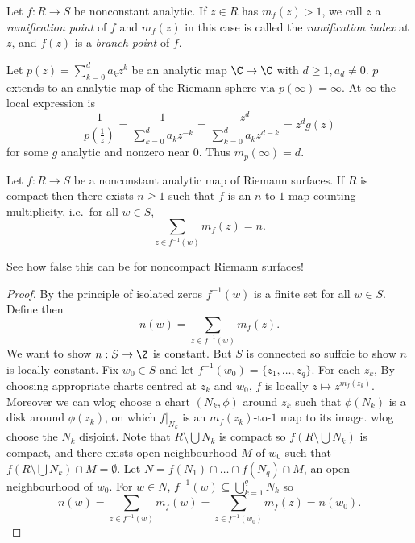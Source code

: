 \documentclass[a4paper]{article}
\begin{document}
\begin{definition}
  Let \(f: R \to S\) be nonconstant analytic. If \(z \in R\) has \(m_f(z) > 1\), we call \(z\) a \emph{ramification point} of \(f\) and \(m_f(z)\) in this case is called the \emph{ramification index} at \(z\), and \(f(z)\) is a \emph{branch point} of \(f\).
\end{definition}

\begin{eg}
  Let \(p(z) = \sum_{k = 0}^d a_kz^k\) be an analytic map \(\C \to \C\) with \(d \geq 1, a_d \neq 0\). \(p\) extends to an analytic map of the Riemann sphere via \(p(\infty) = \infty\). At \(\infty\) the local expression is
  \[
    \frac{1}{p(\frac{1}{z})} = \frac{1}{\sum_{k = 0}^d a_k z^{-k}} = \frac{z^d}{\sum_{k = 0}^d a_k z^{d - k}} = z^d g(z)
  \]
  for some \(g\) analytic and nonzero near \(0\). Thus \(m_p(\infty) = d\).
\end{eg}

\begin{theorem}
  Let \(f: R \to S\) be a nonconstant analytic map of Riemann surfaces. If \(R\) is compact then there exists \(n \geq 1\) such that \(f\) is an \(n\)-to-\(1\) map counting multiplicity, i.e.\ for all \(w \in S\),
  \[
    \sum_{z \in f^{-1}(w)} m_f(z) = n.
  \]
\end{theorem}

See how false this can be for noncompact Riemann surfaces!

\begin{proof}
  By the principle of isolated zeros \(f^{-1}(w)\) is a finite set for all \(w \in S\). Define then
  \[
    n(w) = \sum_{z \in f^{-1}(w)} m_f(z).
  \]
  We want to show \(n: S \to \Z\) is constant. But \(S\) is connected so suffcie to show \(n\) is locally constant. Fix \(w_0 \in S\) and let \(f^{-1}(w_0) = \{z_1, \dots, z_q\}\). For each \(z_k\), By choosing appropriate charts centred at \(z_k\) and \(w_0\), \(f\) is locally \(z \mapsto z^{m_f(z_k)}\). Moreover we can wlog choose a chart \((N_k, \phi)\) around \(z_k\) such that \(\phi(N_k)\) is a disk around \(\phi(z_k)\), on which \(f|_{N_k}\) is an \(m_f(z_k)\)-to-\(1\) map to its image. wlog choose the \(N_k\) disjoint. Note that \(R \setminus \bigcup N_k\) is compact so \(f(R \setminus \bigcup N_k)\) is compact, and there exists open neighbourhood \(M\) of \(w_0\) such that \(f(R \setminus \bigcup N_k) \cap M = \emptyset\). Let \(N = f(N_1) \cap \dots \cap f(N_q) \cap M\), an open neighbourhood of \(w_0\). For \(w \in N\), \(f^{-1}(w) \subseteq \bigcup_{k = 1}^q N_k\) so
  \[
    n(w) = \sum_{z \in f^{-1}(w)} m_f(w) = \sum_{z \in f^{-1}(w_0)} m_f(z) = n(w_0).
  \]
\end{proof}
\end{document}
